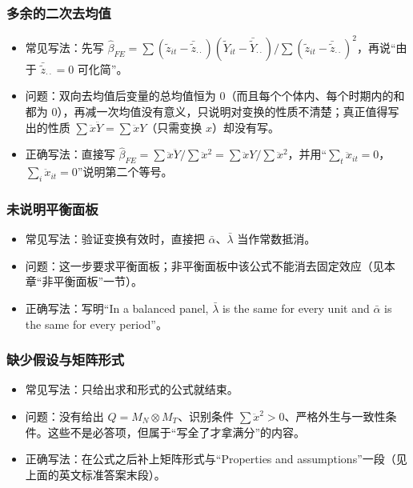 \subsubsection{多余的二次去均值}
\begin{itemize}
  \item 常见写法：先写 $\hat\beta_{FE}=\sum(\tilde z_{it}-\bar{\tilde z}_{\cdot\cdot})(\tilde Y_{it}-\bar{\tilde Y}_{\cdot\cdot})/\sum(\tilde z_{it}-\bar{\tilde z}_{\cdot\cdot})^2$，再说“由于 $\bar{\tilde z}_{\cdot\cdot}=0$ 可化简”。
  \item 问题：双向去均值后变量的总均值恒为 0（而且每个个体内、每个时期内的和都为 0），再减一次均值没有意义，只说明对变换的性质不清楚；真正值得写出的性质 $\sum\ddot x\ddot Y=\sum\ddot xY$（只需变换 $x$）却没有写。
  \item 正确写法：直接写 $\hat\beta_{FE}=\sum\ddot x\ddot Y/\sum\ddot x^2=\sum\ddot xY/\sum\ddot x^2$，并用“$\sum_t\ddot x_{it}=0$，$\sum_i\ddot x_{it}=0$”说明第二个等号。
\end{itemize}

\subsubsection{未说明平衡面板}
\begin{itemize}
  \item 常见写法：验证变换有效时，直接把 $\bar\alpha$、$\bar\lambda$ 当作常数抵消。
  \item 问题：这一步要求平衡面板；非平衡面板中该公式不能消去固定效应（见本章“非平衡面板”一节）。
  \item 正确写法：写明“In a balanced panel, $\bar\lambda$ is the same for every unit and $\bar\alpha$ is the same for every period”。
\end{itemize}

\subsubsection{缺少假设与矩阵形式}
\begin{itemize}
  \item 常见写法：只给出求和形式的公式就结束。
  \item 问题：没有给出 $Q=M_N\otimes M_T$、识别条件 $\sum\ddot x^2>0$、严格外生与一致性条件。这些不是必答项，但属于“写全了才拿满分”的内容。
  \item 正确写法：在公式之后补上矩阵形式与“Properties and assumptions”一段（见上面的英文标准答案末段）。
\end{itemize}

